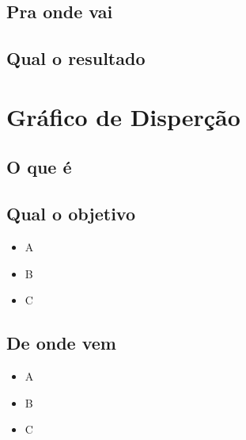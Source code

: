 \documentclass[
]{article}
\providecommand{\tightlist}{%
  \setlength{\itemsep}{0pt}\setlength{\parskip}{0pt}}
\begin{document}
\hypertarget{pra-onde-vai-1}{%
\subsection*{Pra onde vai}\label{pra-onde-vai-1}}

\hypertarget{qual-o-resultado-1}{%
\subsection*{Qual o resultado}\label{qual-o-resultado-1}}

\hypertarget{gruxe1fico-de-disperuxe7uxe3o}{%
\section{Gráfico de Disperção}\label{gruxe1fico-de-disperuxe7uxe3o}}

\hypertarget{o-que-uxe9-2}{%
\subsection*{O que é}\label{o-que-uxe9-2}}

\hypertarget{qual-o-objetivo-2}{%
\subsection*{Qual o objetivo}\label{qual-o-objetivo-2}}

\begin{itemize}
\tightlist
\item
  A
\item
  B
\item
  C
\end{itemize}

\hypertarget{de-onde-vem-2}{%
\subsection*{De onde vem}\label{de-onde-vem-2}}

\begin{itemize}
\tightlist
\item
  A
\item
  B
\item
  C
\end{itemize}
\end{document}
